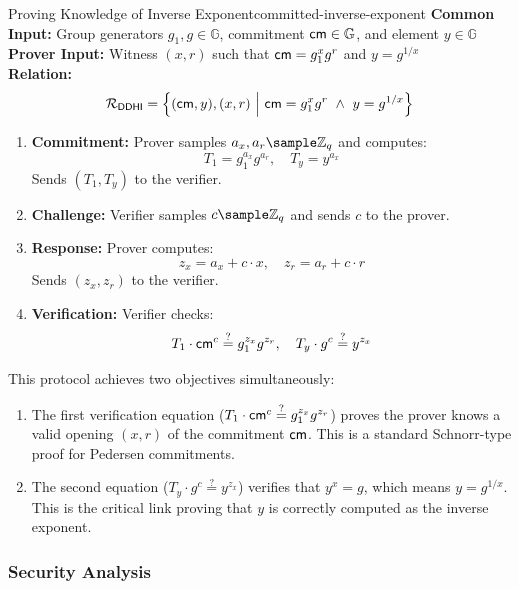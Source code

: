 \begin{protocol}{Proving Knowledge of Inverse Exponent}{committed-inverse-exponent}\label{pok-committed-inverse-exponent}
\textbf{Common Input:} Group generators $g_1, g \in \mathbb{G}$, commitment $\mathsf{cm} \in \mathbb{G}$, and element $y \in \mathbb{G}$ \\
\textbf{Prover Input:} Witness $(x, r)$ such that $\mathsf{cm} = g_1^x g^r$ and $y = g^{1/x}$ \\
\textbf{Relation:} 
\[
\mathcal{R}_{\mathsf{DDHI}} = \left\{ (\mathsf{cm}, y), (x, r) \ \middle|\ \mathsf{cm} = g_1^x g^r \ \land\ y = g^{1/x} \right\}
\]
\begin{enumerate}
    \item \textbf{Commitment:} Prover samples $a_x, a_r \sample \mathbb{Z}_q$ and computes:
    \[
    T_1 = g_1^{a_x} g^{a_r}, \quad T_y = y^{a_x}
    \]
    Sends $(T_1, T_y)$ to the verifier.

    \item \textbf{Challenge:} Verifier samples $c  \sample  \mathbb{Z}_q$ and sends $c$ to the prover.

    \item \textbf{Response:} Prover computes:
    \[
    z_x = a_x + c \cdot x, \quad z_r = a_r + c \cdot r
    \]
    Sends $(z_x, z_r)$ to the verifier.

    \item \textbf{Verification:} Verifier checks:
    \[
    T_1 \cdot \mathsf{cm}^c \stackrel{?}{=} g_1^{z_x} g^{z_r}, \quad T_y \cdot g^c \stackrel{?}{=} y^{z_x}
    \]
\end{enumerate}
\end{protocol}

This protocol achieves two objectives simultaneously:
\begin{enumerate}
    \item The first verification equation ($T_1 \cdot \mathsf{cm}^c \stackrel{?}{=} g_1^{z_x} g^{z_r}$) proves the prover knows a valid opening $(x, r)$ of the commitment $\mathsf{cm}$. This is a standard Schnorr-type proof for Pedersen commitments.
    
    \item The second equation ($T_y \cdot g^c \stackrel{?}{=} y^{z_x}$) verifies that $y^x = g$, which means $y = g^{1/x}$. This is the critical link proving that $y$ is correctly computed as the inverse exponent.
\end{enumerate}


\subsubsection{Security Analysis}


